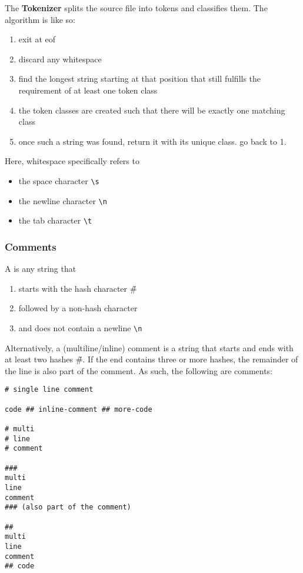 \documentclass{article}
\begin{document}
The {\bf Tokenizer} splits the source file into tokens
and classifies them. The algorithm is like so:
\begin{enumerate}
    \item exit at eof
    \item discard any whitespace
    \item find the longest string starting at that position
    that still fulfills the requirement
    of at least one token class
    \item the token classes are created such that there
    will be exactly one matching class
    \item once such a string was found, return it with
    its unique class. go back to 1.
\end{enumerate}
Here, whitespace specifically refers to
\begin{itemize}
    \item the space character \verb$\s$
    \item the newline character \verb$\n$
    \item the tab character \verb$\t$
\end{itemize}
\fi

\subsubsection{Comments}
A \tcom is any string that
\begin{enumerate}
    \item starts with the hash character \v{\#}
    \item followed by a non-hash character
    \item and does not contain a newline \verb$\n$
\end{enumerate}

Alternatively, a (multiline/inline) comment is a string that
starts and ends with at least two hashes \v{\#}.
If the end contains three or more hashes, the remainder of the line
is also part of the comment.
As such, the following are comments:
\begin{verbatim}
# single line comment

code ## inline-comment ## more-code

# multi
# line
# comment

###
multi
line 
comment
### (also part of the comment)

##
multi
line
comment
## code

\end{verbatim}
\end{document}
